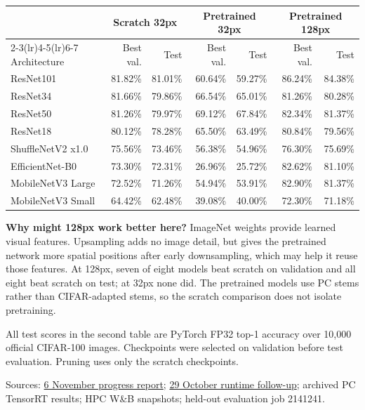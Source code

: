 \documentclass[10pt,a4paper]{article}
\newcommand{\smallcap}[1]{{\footnotesize\color{navy}#1}\par}
\providecommand{\RoutedProgressUpdate}{1}
\begin{document}
\begin{center}\small
\begin{tabular}{@{}lrrrrrr@{}}\toprule
 & \multicolumn{2}{c}{Scratch 32px} & \multicolumn{2}{c}{Pretrained 32px} & \multicolumn{2}{c}{Pretrained 128px}\\
\cmidrule(lr){2-3}\cmidrule(lr){4-5}\cmidrule(lr){6-7}
Architecture & Best val. & Test & Best val. & Test & Best val. & Test\\
\midrule
ResNet101          & 81.82\% & 81.01\% & 60.64\% & 59.27\% & 86.24\% & 84.38\%\\
ResNet34           & 81.66\% & 79.86\% & 66.54\% & 65.01\% & 81.26\% & 80.28\%\\
ResNet50           & 81.26\% & 79.97\% & 69.12\% & 67.84\% & 82.34\% & 81.37\%\\
ResNet18           & 80.12\% & 78.28\% & 65.50\% & 63.49\% & 80.84\% & 79.56\%\\
ShuffleNetV2 x1.0  & 75.56\% & 73.46\% & 56.38\% & 54.96\% & 76.30\% & 75.69\%\\
EfficientNet-B0    & 73.30\% & 72.31\% & 26.96\% & 25.72\% & 82.62\% & 81.10\%\\
MobileNetV3 Large  & 72.52\% & 71.26\% & 54.94\% & 53.91\% & 82.90\% & 81.37\%\\
MobileNetV3 Small  & 64.42\% & 62.48\% & 39.08\% & 40.00\% & 72.30\% & 71.18\%\\
\bottomrule\end{tabular}
\end{center}
\textbf{Why might 128px work better here?}
ImageNet weights provide learned visual features. Upsampling adds no image detail, but gives the pretrained network more spatial positions after early downsampling, which may help it reuse those features. At 128px, seven of eight models beat scratch on validation and all eight beat scratch on test; at 32px none did. The pretrained models use PC stems rather than CIFAR-adapted stems, so the scratch comparison does not isolate pretraining.

\smallcap{All test scores in the second table are PyTorch FP32 top-1 accuracy over 10,000 official CIFAR-100 images. Checkpoints were selected on validation before test evaluation. Pruning uses only the scratch checkpoints.}

\smallcap{Sources: \href{https://github.com/erenolmez/energy-efficient-edge-ai/blob/9dc335f/progress_reports/2026-11-06/progress_report.tex}{6 November progress report}; \href{https://github.com/erenolmez/energy-efficient-edge-ai/blob/9dc335f/progress_reports/2026-10-29/runtime_explanations.tex}{29 October runtime follow-up}; archived PC TensorRT results; HPC W\&B snapshots; held-out evaluation job 2141241.}
\ifdefined\RoutedProgressUpdate
\newpage

\newpage

\fi
\end{document}
